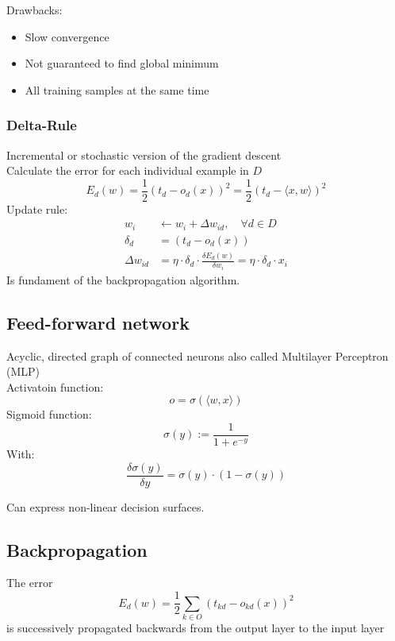 Drawbacks:
\begin{itemize}
\item Slow convergence
\item Not guaranteed to find global minimum
\item All training samples at the same time
\end{itemize}

\subsubsection{Delta-Rule}%
\label{nn:ssub:delta_rule}
Incremental or stochastic version of the gradient descent\\
Calculate the error for each individual example in \(D\)\\
\[E_d (w) = \frac{1}{2}(t_d - o_d(x))^2 = \frac{1}{2}(t_d - \langle x, w\rangle)^2\]
Update rule:
\begin{align*}
  w_i &\leftarrow w_i + \Delta w_{id}, \quad \forall d \in D\\
  \delta_d &= (t_d - o_d (x))\\
  \Delta w_{id} &= \eta \cdot \delta_d \cdot \frac{\delta E_d (w)}{\delta w_i} = \eta \cdot \delta_d \cdot x_i
\end{align*}
Is fundament of the backpropagation algorithm.

\subsection{Feed-forward network}%
\label{nn:sub:feed_forward_network}
Acyclic, directed graph of connected neurons also called Multilayer Perceptron (MLP)\\
Activatoin function:
\[o = \sigma (\langle w, x\rangle)\]
Sigmoid function:
\[\sigma (y) := \frac{1}{1 + e^{-y}}\]
With:
\[\frac{\delta \sigma (y)}{\delta y} = \sigma (y) \cdot (1 - \sigma (y))\]

Can express non-linear decision surfaces.

\subsection{Backpropagation}%
\label{nn:sub:backpropagation}
The error
\[E_d (w) = \frac{1}{2}  \sum_{k \in O} (t_{kd} - o_{kd}(x))^2\]
is successively propagated backwards from the output layer to the input layer\\

